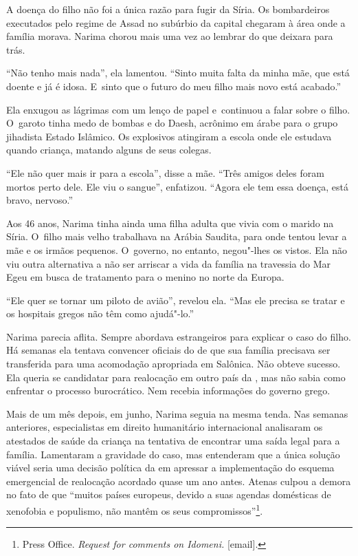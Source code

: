 A doença do filho não foi a única razão para fugir da Síria. Os
bombardeiros executados pelo regime de Assad no subúrbio da capital
chegaram à área onde a família morava. Narima chorou mais uma vez ao
lembrar do que deixara para trás.

``Não tenho mais nada'', ela lamentou. ``Sinto muita falta da minha mãe,
que está doente e já é idosa. E~sinto que o futuro do meu filho mais
novo está acabado.''

Ela enxugou as lágrimas com um lenço de papel e~continuou a falar sobre
o filho. O~garoto tinha medo de bombas e do Daesh, acrônimo em árabe
para o grupo jihadista Estado Islâmico. Os explosivos atingiram a escola
onde ele estudava quando criança, matando alguns de seus colegas.

``Ele não quer mais ir para a escola'', disse a mãe. ``Três amigos deles
foram mortos perto dele. Ele viu o sangue'', enfatizou. ``Agora ele tem
essa doença, está bravo, nervoso.''

Aos 46 anos, Narima tinha ainda uma filha adulta que vivia com o marido na
Síria. O~filho mais velho trabalhava na Arábia Saudita, para onde tentou
levar a mãe e os irmãos pequenos. O~governo, no entanto, negou"-lhes os
vistos. Ela não viu outra alternativa a não ser arriscar a vida da
família na travessia do Mar Egeu em busca de tratamento para o menino no
norte da Europa.

``Ele quer se tornar um piloto de avião'', revelou ela. ``Mas ele
precisa se tratar e os hospitais gregos não têm como ajudá"-lo.''

Narima parecia aflita. Sempre abordava estrangeiros para explicar o caso
do filho. Há semanas ela tentava convencer oficiais do  de que sua
família precisava ser transferida para uma acomodação apropriada em
Salônica. Não obteve sucesso. Ela queria se candidatar para realocação
em outro país da , mas não sabia como enfrentar o processo
burocrático. Nem recebia informações do governo grego.

Mais de um mês depois, em junho, Narima seguia na mesma tenda. Nas
semanas anteriores, especialistas em direito humanitário internacional
analisaram os atestados de saúde da criança na tentativa de encontrar
uma saída legal para a família. Lamentaram a gravidade do caso, mas
entenderam que a única solução viável seria uma decisão política da 
em apressar a implementação do esquema emergencial de realocação
acordado quase um ano antes. Atenas culpou a demora no fato de que
``muitos países europeus, devido a suas agendas domésticas de xenofobia
e populismo, não mantêm os seus compromissos''\footnote{ Press Office. \emph{Request for comments on
Idomeni}\emph{.} {[}email{]}.}.

